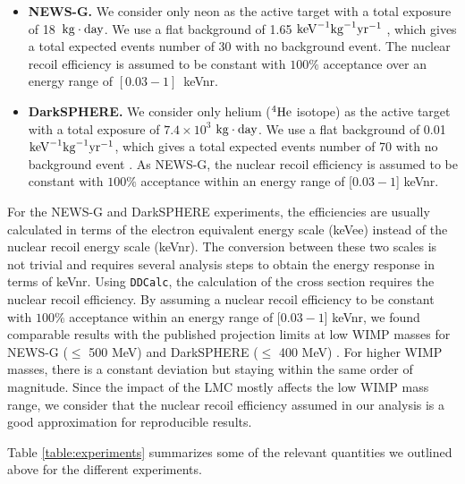 \documentclass[a4paper,11pt]{article}
\begin{document}
\begin{itemize}
  \item \textbf{NEWS-G.} We consider only neon as the active target with a total exposure of 18~$\rm{kg}\cdot\rm{day}$. We use a flat background of 1.65 $\rm{keV}^{-1} \rm{kg}^{-1} \rm{yr}^{-1}$ \cite{Durnford:2021mzg}, which gives a total expected events number of 30 with no background event. The nuclear recoil efficiency is assumed to be constant with $100\%$ acceptance over an energy range of $[0.03 - 1]$~keVnr. 



  \item \textbf{DarkSPHERE.} We consider only helium ($^{4}{\rm He}$ isotope) as the active target with a total exposure of $7.4\times 10^{3}$ $\rm{kg}\cdot\rm{day}$. We use a flat background of 0.01 $\rm{keV}^{-1} \rm{kg}^{-1} \rm{yr}^{-1}$, which gives a total expected events number of 70 with no background event \cite{NEWS-G:2023qwh}. As NEWS-G, the nuclear recoil efficiency is assumed to be constant with $100\%$ acceptance within an energy range of [$0.03 - 1$] keVnr. 
  
\end{itemize}

For the NEWS-G and DarkSPHERE experiments, the efficiencies are usually calculated in terms of the electron equivalent energy scale (keVee) instead of the nuclear recoil energy scale (keVnr). The conversion between these two scales is not trivial and requires several analysis steps to obtain the energy response in terms of keVnr. Using \texttt{DDCalc}, the calculation of the cross section requires the nuclear recoil efficiency. By assuming a nuclear recoil efficiency to be constant with $100\%$ acceptance within an energy range of [$0.03 - 1$] keVnr, we found comparable results with the published projection limits at low WIMP masses for NEWS-G ($\leq$ 500 MeV) \cite{Durnford:2021mzg} and DarkSPHERE ($\leq$ 400 MeV) \cite{NEWS-G:2023qwh}. For higher WIMP masses, there is a constant deviation but staying within the same order of magnitude.  Since the impact of the LMC mostly affects the low WIMP mass range, we consider that the nuclear recoil efficiency assumed in our analysis is a good approximation for reproducible results.

Table \ref{table:experiments} summarizes some of the relevant quantities we  outlined above for the different experiments.
\end{document}
